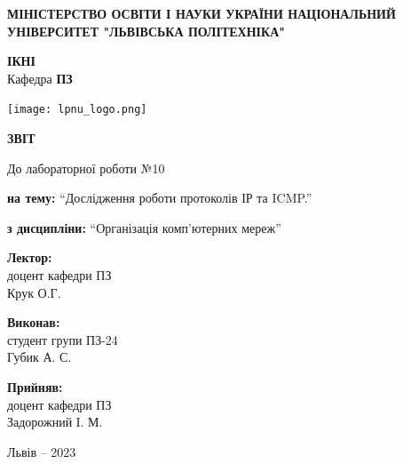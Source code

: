 \documentclass[12pt]{extarticle}
\begin{document}
\begin{titlepage}
    \begin{center}
        \textbf{\normalsize{\MakeUppercase{
            Міністерство Освіти і науки України
            Національний університет "Львівська політехніка"
        }}}

        \begin{flushright}
        \textbf{ІКНІ}\\
        Кафедра \textbf{ПЗ}
        \end{flushright}
        \vspace{15mm}

        \texttt{[image: lpnu\_logo.png]}

        \vspace*{\fill}

        \textbf{\normalsize{\MakeUppercase{Звіт}}}
            
        До лабораторної роботи №10

        \textbf{на тему:} “Дослідження роботи протоколів ІР та ICMP.”

        \textbf{з дисципліни:} “Організація комп'ютерних мереж”
            
        \vspace*{\fill}

        \begin{flushright}

            \textbf{Лектор:}\\
            доцент кафедри ПЗ\\
            Крук О.Г.\\
            \vspace{12pt}

            \textbf{Виконав:}\\
            студент групи ПЗ-24\\
            Губик А. С.\\
            \vspace{12pt}

            \textbf{Прийняв:}\\
            доцент кафедри ПЗ\\
            Задорожний І. М.\\
        \vspace{12pt}
        \end{flushright}

        Львів -- 2023
            
            
    \end{center}
\end{titlepage}
\end{document}
